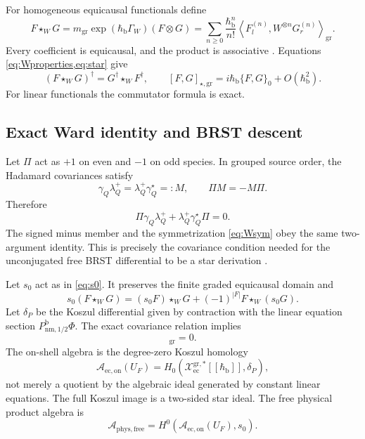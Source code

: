 \documentclass[11pt]{article}
\theoremstyle{definition}
\theoremstyle{remark}
\newcommand{\U}{U_{F}}
\newcommand{\cA}{\mathcal A}
\newcommand{\hbarLB}{\hbar_{\mathrm{b}}}
\begin{document}
For homogeneous equicausal functionals define
\begin{equation}
 F\star_WG
 =m_{\mathrm{gr}}\exp(\hbarLB\Gamma_W)(F\otimes G)
 =\sum_{n\geq0}\frac{\hbarLB^n}{n!}
 \left\langle F_l^{(n)},W^{\otimes n}G_r^{(n)}\right\rangle_{\mathrm{gr}}.
 \label{eq:star}
\end{equation}
Every coefficient is equicausal, and the product is associative
\cite{HawkinsRejznerVisser2023}.  Equations \cref{eq:Wproperties,eq:star} give
\begin{equation}
 (F\star_WG)^\dagger=G^\dagger\star_WF^\dagger,
 \qquad
 [F,G]_{\star,\mathrm{gr}}=i\hbarLB\{F,G\}_0+O(\hbarLB^2).
 \label{eq:starprops}
\end{equation}
For linear functionals the commutator formula is exact.

\subsection{Exact Ward identity and BRST descent}

Let $\Pi$ act as $+1$ on even and $-1$ on odd species.  In grouped source order, the
Hadamard covariances satisfy
\begin{equation}
 \gamma_Q\lambda_Q^+=\lambda_Q^+\gamma_Q^\star=:M,
 \qquad \Pi M=-M\Pi.
\end{equation}
Therefore
\begin{equation}
 \Pi\gamma_Q\lambda_Q^++\lambda_Q^+\gamma_Q^\star\Pi=0.
 \label{eq:ward2arg}
\end{equation}
The signed minus member and the symmetrization \cref{eq:Wsym} obey the same
two-argument identity.  This is precisely the covariance condition needed for the
unconjugated free BRST differential to be a star derivation
\cite{Rejzner2013}.

Let $s_0$ act as in \cref{eq:s0}.  It preserves the finite graded equicausal domain and
\begin{equation}
 s_0(F\star_WG)=(s_0F)\star_WG+(-1)^{|F|}F\star_W(s_0G).
 \label{eq:brstderivation}
\end{equation}
Let $\delta_P$ be the Koszul differential given by contraction with the linear equation
section $P_{\mathrm{nm},1/2}^{\mathrm{b}}\Phi$.  The exact covariance relation implies
\begin{equation}
 [s_0,\delta_P]_{\mathrm{gr}}=0.
\end{equation}
The on-shell algebra is the degree-zero Koszul homology
\begin{equation}
 \cA_{\mathrm{ec,on}}(\U)=
 H_0(\mathcal X_{\mathrm{ec}}^{\mathrm{gr},*}[[\hbarLB]],\delta_P),
 \label{eq:onshellalg}
\end{equation}
not merely a quotient by the algebraic ideal generated by constant linear equations.
The full Koszul image is a two-sided star ideal.  The free physical product algebra is
\begin{equation}
 \cA_{\mathrm{phys,free}}=
 H^0(\cA_{\mathrm{ec,on}}(\U),s_0).
 \label{eq:physicalalg}
\end{equation}
\end{document}
